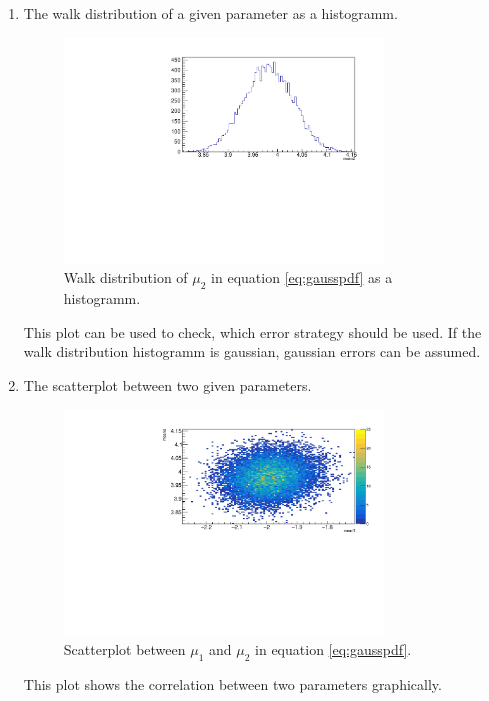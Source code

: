 \documentclass[english]{uzhpub}
\begin{document}
\begin{enumerate}
  \item The walk distribution of a given parameter as a histogramm.
  \begin{figure}[H]
    \centering
    \includegraphics[width=0.8\textwidth]{RooMCMC/walkDisHis}
    \caption{Walk distribution of $\mu_2$ in equation \ref{eq:gausspdf} as a histogramm.}
    \label{fig:walkDisHis}
  \end{figure}
  This plot can be used to check, which error strategy should be used. If the walk distribution histogramm is gaussian, gaussian errors can be assumed. \\

  \item The scatterplot between two given parameters.
  \begin{figure}[H]
    \centering
    \includegraphics[width=0.8\textwidth]{RooMCMC/scatter}
    \caption{Scatterplot between $\mu_1$ and $\mu_2$ in equation \ref{eq:gausspdf}.}
    \label{fig:scatter}
  \end{figure}
  This plot shows the correlation between two parameters graphically.
\end{enumerate}
\end{document}
